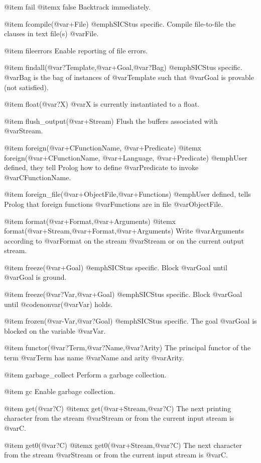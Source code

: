 {{{{{@item fail
@itemx false
Backtrack immediately.

@item fcompile(@var{+File})
@emph{SICStus specific.} Compile file-to-file the clauses in text file(s)
@var{File}.

@item fileerrors
Enable reporting of file errors.

@item findall(@var{?Template},@var{+Goal},@var{?Bag})
@emph{SICStus specific.} @var{Bag} is the bag of instances of
@var{Template} such that @var{Goal} is provable (not satisfied).

@item float(@var{?X})
@var{X} is currently instantiated to a float.

@item flush_output(@var{+Stream})
Flush the buffers associated with @var{Stream}.

@item foreign(@var{+CFunctionName}, @var{+Predicate})
@itemx foreign(@var{+CFunctionName}, @var{+Language}, @var{+Predicate})
@emph{User defined}, they tell Prolog how to define @var{Predicate} to
invoke @var{CFunctionName}.

@item foreign_file(@var{+ObjectFile},@var{+Functions})
@emph{User defined}, tells Prolog that foreign functions @var{Functions}
are in file @var{ObjectFile}.

@item format(@var{+Format},@var{+Arguments})
@itemx format(@var{+Stream},@var{+Format},@var{+Arguments})
Write @var{Arguments} according to @var{Format} on the stream
@var{Stream} or on the current output stream.

@item freeze(@var{+Goal})
@emph{SICStus specific.} Block @var{Goal} until @var{Goal} is ground.

@item freeze(@var{?Var},@var{+Goal})
@emph{SICStus specific.} Block @var{Goal} until @code{nonvar(@var{Var})}
holds.

@item frozen(@var{-Var},@var{?Goal})
@emph{SICStus specific.} The goal @var{Goal} is blocked on the variable
@var{Var}.

@item functor(@var{?Term},@var{?Name},@var{?Arity})
The principal functor of the term @var{Term} has name @var{Name} and arity
@var{Arity}.

@item garbage_collect
Perform a garbage collection.

@item gc
Enable garbage collection.

@item get(@var{?C})
@itemx get(@var{+Stream},@var{?C})
The next printing character from the stream @var{Stream} or from the
current input stream is @var{C}.

@item get0(@var{?C})
@itemx get0(@var{+Stream},@var{?C})
The next character from the stream @var{Stream} or from the current
input stream is @var{C}.

}}}}}
